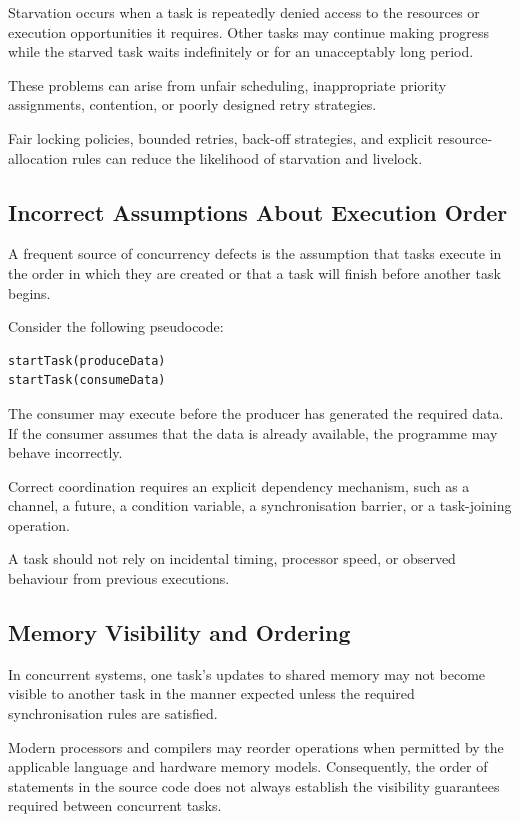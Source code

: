 Starvation occurs when a task is repeatedly denied access to the resources or execution opportunities it requires. Other tasks may continue making progress while the starved task waits indefinitely or for an unacceptably long period.

These problems can arise from unfair scheduling, inappropriate priority assignments, contention, or poorly designed retry strategies.

Fair locking policies, bounded retries, back-off strategies, and explicit resource-allocation rules can reduce the likelihood of starvation and livelock.

\subsection{Incorrect Assumptions About Execution Order}

A frequent source of concurrency defects is the assumption that tasks execute in the order in which they are created or that a task will finish before another task begins.

Consider the following pseudocode:

\begin{lstlisting}
startTask(produceData)
startTask(consumeData)
\end{lstlisting}

The consumer may execute before the producer has generated the required data. If the consumer assumes that the data is already available, the programme may behave incorrectly.

Correct coordination requires an explicit dependency mechanism, such as a channel, a future, a condition variable, a synchronisation barrier, or a task-joining operation.

A task should not rely on incidental timing, processor speed, or observed behaviour from previous executions.

\subsection{Memory Visibility and Ordering}

In concurrent systems, one task's updates to shared memory may not become visible to another task in the manner expected unless the required synchronisation rules are satisfied.

Modern processors and compilers may reorder operations when permitted by the applicable language and hardware memory models. Consequently, the order of statements in the source code does not always establish the visibility guarantees required between concurrent tasks.

